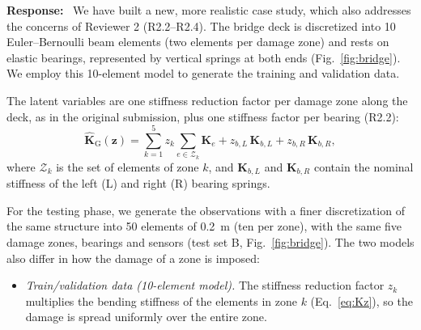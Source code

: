 \documentclass[11pt]{article}
\newenvironment{response}{\par\smallskip\noindent\color{resp}\textbf{Response:}\ }{\par}
\newcommand{\z}{\mathbf{z}}
\begin{document}
\begin{response}
We have  built a new, more realistic case study, which also addresses the
concerns of Reviewer 2 (R2.2--R2.4). The bridge deck is discretized into 10 Euler--Bernoulli beam elements (two elements per damage zone) and rests on elastic bearings, represented by vertical springs at both ends (Fig.~\ref{fig:bridge}). 
We employ this 10-element model to generate the training and validation data.

The latent variables are one stiffness reduction factor per damage zone along the deck, as in the original submission, plus one stiffness factor per bearing (R2.2):
\begin{equation}
\hat{\mathbf{K}}_{\mathrm{G}}(\z)=\sum_{k=1}^{5} z_k\sum_{e\in\mathcal{Z}_k}\mathbf{K}_{e}
+z_{b,L}\,\mathbf{K}_{b,L}+z_{b,R}\,\mathbf{K}_{b,R},
\label{eq:Kz}
\end{equation}
where $\mathcal{Z}_k$ is the set of elements of zone $k$, and $\mathbf{K}_{b,L}$ and $\mathbf{K}_{b,R}$ contain the nominal stiffness of the left (L) and right (R) bearing springs.

For the testing phase, we generate the observations with a finer discretization of the same structure into 50 elements
of 0.2~m (ten per zone), with the same five damage zones, bearings and sensors (test set B, Fig.~\ref{fig:bridge}). The
two models also differ in how the damage of a zone is imposed:
\begin{itemize}[leftmargin=*]
\item \emph{Train/validation data (10-element model).} The stiffness reduction factor $z_k$ multiplies the bending stiffness of the elements in zone $k$ (Eq.~\eqref{eq:Kz}), so the damage is spread uniformly over the entire zone. 


\end{itemize}
\end{response}
\end{document}
